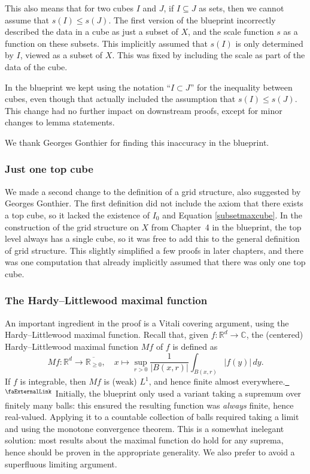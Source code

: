 \documentclass[12pt]{amsart}
\newcommand*{\complex}{\mathbb{C}} %
\newcommand*{\real}{\mathbb{R}} %
\newcommand{\ennreal}{\overline{\real_{\ge0}}}
\newcommand{\extlink}{~\ensuremath{{}^\text{\faExternalLink}}}
\theoremstyle{definition}
\theoremstyle{plain}
\begin{document}
This also means that for two cubes $I$ and $J$, if $I\subseteq J$ as sets,
then we cannot assume that $s(I)\le s(J)$.
The first version of the blueprint incorrectly described the data in a cube as just a subset of $X$,
and the scale function $s$ as a function on these subsets.
This implicitly assumed that $s(I)$ is only determined by $I$, viewed as a subset of $X$.
This was fixed by including the scale as part of the data of the cube.

In the blueprint we kept using the notation ``$I \subset J$'' for the inequality between cubes,
even though that actually included the assumption that $s(I) \le s(J)$.
This change had no further impact on downstream proofs, except for minor changes to lemma statements.

We thank Georges Gonthier for finding this inaccuracy in the blueprint.

\subsubsection{Just one top cube}

We made a second change to the definition of a grid structure, also suggested by Georges Gonthier.
The first definition did not include the axiom that there exists a top cube,
so it lacked the existence of $I_0$ and Equation \eqref{subsetmaxcube}.
In the construction of the grid structure on $X$
from Chapter~4 in the blueprint,
the top level always has a single cube,
so it was free to add this to the general definition of grid structure.
This slightly simplified a few proofs in later chapters,
and there was one computation that already implicitly assumed
that there was only one top cube.

\subsubsection{The Hardy--Littlewood maximal function} An important ingredient in the proof is a Vitali covering argument, using the Hardy--Littlewood maximal function.
Recall that, given $f\colon\real^d\to\complex$, the (centered) Hardy–Littlewood maximal function $M f$ of $f$ is defined as
\begin{equation*}
Mf\colon\real^d \to\ennreal, \quad x\mapsto \sup_{r>0}\frac{1}{|B(x,r)|}\int_{B(x,r)}|f(y)|\,dy.
\end{equation*}
If $f$ is integrable, then $M f$ is (weak) $L^1$, and hence finite almost everywhere.\href{https://github.com/fpvandoorn/carleson/blob/c0ee0ad335fc74d4d507393b443759d1ce929e63/Carleson/ToMathlib/HardyLittlewood.lean#L369}{\extlink} Initially, the blueprint only used a variant taking a supremum over finitely many balls: this ensured the resulting function was \emph{always} finite, hence real-valued. Applying it to a countable collection of balls required taking a limit and using the monotone convergence theorem.
This is a somewhat inelegant solution: most results about the maximal function do hold for any suprema, hence should be proven in the appropriate generality. We also prefer to avoid a superfluous limiting argument.
\end{document}
